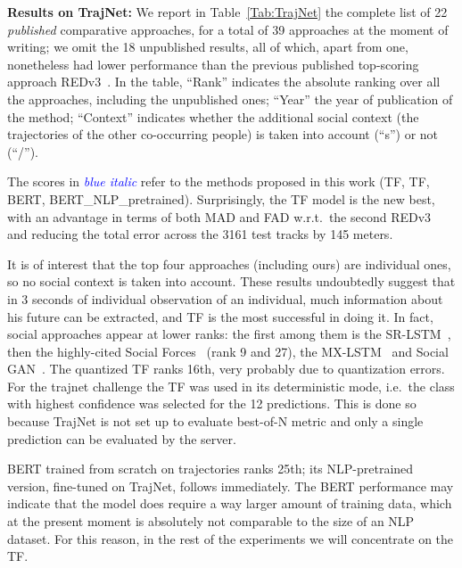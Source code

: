 \documentclass[a4paper,conference]{IEEEtran}
\begin{document}
\noindent\textbf{Results on TrajNet:}
We report in Table~\ref{Tab:TrajNet} the complete list of 22 \emph{published} comparative approaches, for a total of 39 approaches at the moment of writing; we omit the 18 unpublished results, all of which, apart from one, nonetheless had lower performance than the previous published top-scoring approach REDv3~\cite{becker2018evaluation}.
In the table, ``Rank'' indicates the absolute ranking over all the approaches, including the unpublished ones; ``Year'' the year of publication of the method; ``Context'' indicates whether the additional social context (the trajectories of the other co-occurring people) is taken into account (``s'') or not (``/'').


The scores in \textcolor{blue}{\textit{blue italic}} refer to the methods proposed in this work (TF, TF, BERT, BERT\_NLP\_pretrained). 
Surprisingly, the TF model is the new best, with an advantage in terms of both MAD and FAD w.r.t.\ the second REDv3~\cite{becker2018evaluation} and reducing the total error across the 3161 test tracks by 145 meters. 

It is of interest that the top four approaches (including ours) are individual ones, so no social context is taken into account. These results undoubtedly suggest that in 3 seconds of individual observation of an individual, much information about his future can be extracted, and TF is the most successful in doing it. 
In fact,  social approaches appear at lower ranks: the first among them is the SR-LSTM~\cite{zhang2019sr}, then the highly-cited Social Forces~\cite{helbing1995social} (rank 9 and 27), the  MX-LSTM~\cite{Hasan18} and Social GAN~\cite{gupta2018social}. 
The quantized TF ranks 16th, very probably due to quantization errors.
For the trajnet challenge the TF was used in its deterministic mode, i.e.\ the class with highest confidence was selected for the 12 predictions. This is done so because TrajNet is not set up to evaluate best-of-N metric and only a single prediction can be evaluated by the server.

BERT trained from scratch on trajectories ranks 25th; its  NLP-pretrained version, fine-tuned on TrajNet, follows immediately. The BERT performance may indicate that the model does require a way larger amount of training data, which at the present moment is absolutely not comparable to the size of an NLP dataset. For this reason, in the rest of the experiments we will concentrate on the TF. 
\end{document}
